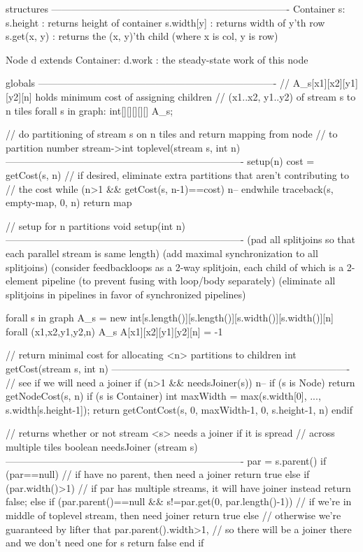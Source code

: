 structures
-------------------------------------------------------------------------
Container s:
  s.height       : returns height of container
  s.width[y]     : returns width of y'th row
  s.get(x, y)    : returns the (x, y)'th child (where x is col, y is row)

Node d extends Container:
  d.work         : the steady-state work of this node

globals
-------------------------------------------------------------------------
// A_s[x1][x2][y1][y2][n] holds minimum cost of assigning children 
// (x1..x2, y1..y2) of stream s to n tiles
forall s in graph:  int[][][][][] A_s;

// do partitioning of stream s on n tiles and return mapping from node
// to partition number
stream->int toplevel(stream s, int n)
-------------------------------------------------------------------------
setup(n)
cost = getCost(s, n)
// if desired, eliminate extra partitions that aren't contributing to
// the cost
while (n>1 && getCost(s, n-1)==cost)
  n--
endwhile
traceback(s, empty-map, 0, n)
return map

// setup for n partitions
void setup(int n) 
-------------------------------------------------------------------------
(pad all splitjoins so that each parallel stream is same length)
(add maximal synchronization to all splitjoins)
(consider feedbackloops as a 2-way splitjoin, each child of which is a
 2-element pipeline (to prevent fusing with loop/body separately)
(eliminate all splitjoins in pipelines in favor of synchronized pipelines)

forall s in graph
  A_s = new int[s.length()][s.length()][s.width()][s.width()][n]
  forall (x1,x2,y1,y2,n) \in A_s
    A[x1][x2][y1][y2][n] = -1

// return minimal cost for allocating <n> partitions to children
int getCost(stream s, int n)
-------------------------------------------------------------------------
// see if we will need a joiner
if (n>1 && needsJoiner(s)) 
  n--
if (s is Node)
  return getNodeCost(s, n)
if (s is Container)
  int maxWidth = max(s.width[0], ..., s.width[s.height-1]);
  return getContCost(s, 0, maxWidth-1, 0, s.height-1, n)
endif

// returns whether or not stream <s> needs a joiner if it is spread
// across multiple tiles
boolean needsJoiner (stream s)
-------------------------------------------------------------------------
par = s.parent()
if (par==null)
  // if have no parent, then need a joiner
  return true
else if (par.width()>1)
  // if par has multiple streams, it will have joiner instead
  return false;
else if (par.parent()==null && s!=par.get(0, par.length()-1))
  // if we're in middle of toplevel stream, then need joiner
  return true
else
  // otherwise we're guaranteed by lifter that par.parent().width>1,
  // so there will be a joiner there and we don't need one for s
  return false
end if
